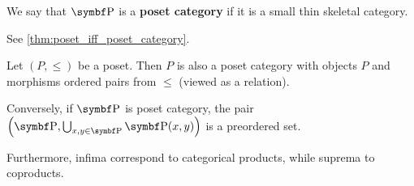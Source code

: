 \begin{definition}\label{def:poset_category}
  We say that \( \Bold{P} \) is a \textbf{poset category} if it is a small thin skeletal category.

  See \cref{thm:poset_iff_poset_category}.
\end{definition}

\begin{proposition}\label{thm:poset_iff_poset_category}
  Let \( (P, \leq) \) be a poset. Then \( P \) is also a poset category with objects \( P \) and morphisms ordered pairs from \( \leq \) (viewed as a relation).

  Conversely, if \( \Bold{P} \) is poset category, the pair \( \left(\Bold{P}, \bigcup_{x, y \in \Bold{P}} \Bold{P}(x, y) \right) \) is a preordered set.

  Furthermore, infima correspond to categorical products, while suprema to coproducts.
\end{proposition}
